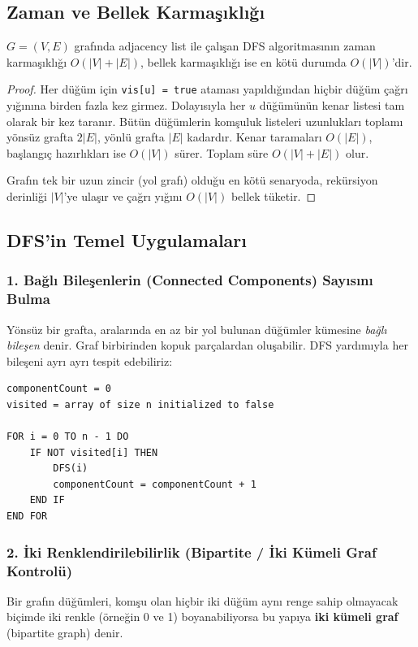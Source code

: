 \subsection{Zaman ve Bellek Karmaşıklığı}
\begin{theorem}
$G=(V, E)$ grafında adjacency list ile çalışan DFS algoritmasının zaman karmaşıklığı $O(|V| + |E|)$, bellek karmaşıklığı ise en kötü durumda $O(|V|)$'dir.
\end{theorem}
\begin{proof}
Her düğüm için \texttt{vis[u] = true} ataması yapıldığından hiçbir düğüm çağrı yığınına birden fazla kez girmez. Dolayısıyla her $u$ düğümünün kenar listesi tam olarak bir kez taranır. Bütün düğümlerin komşuluk listeleri uzunlukları toplamı yönsüz grafta $2|E|$, yönlü grafta $|E|$ kadardır. Kenar taramaları $O(|E|)$, başlangıç hazırlıkları ise $O(|V|)$ sürer. Toplam süre $O(|V| + |E|)$ olur.

Grafın tek bir uzun zincir (yol grafı) olduğu en kötü senaryoda, rekürsiyon derinliği $|V|$'ye ulaşır ve çağrı yığını $O(|V|)$ bellek tüketir.
\end{proof}

\subsection{DFS'in Temel Uygulamaları}

\subsubsection{1. Bağlı Bileşenlerin (Connected Components) Sayısını Bulma}
Yönsüz bir grafta, aralarında en az bir yol bulunan düğümler kümesine \emph{bağlı bileşen} denir. Graf birbirinden kopuk parçalardan oluşabilir. DFS yardımıyla her bileşeni ayrı ayrı tespit edebiliriz:

\begin{lstlisting}
componentCount = 0
visited = array of size n initialized to false

FOR i = 0 TO n - 1 DO
    IF NOT visited[i] THEN
        DFS(i)
        componentCount = componentCount + 1
    END IF
END FOR\end{lstlisting}

\subsubsection{2. İki Renklendirilebilirlik (Bipartite / İki Kümeli Graf Kontrolü)}
Bir grafın düğümleri, komşu olan hiçbir iki düğüm aynı renge sahip olmayacak biçimde iki renkle (örneğin 0 ve 1) boyanabiliyorsa bu yapıya \textbf{iki kümeli graf} (bipartite graph) denir.

